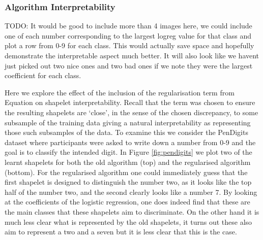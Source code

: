 \subsubsection{Algorithm Interpretability}
TODO: It would be good to include more than 4 images here, we could include one of each number corresponding to the largest logreg value for that class and plot a row from 0-9 for each class. This would actually save space and hopefully demonstrate the interpretable aspect much better. It will also look like we havent just picked out two nice ones and two bad ones if we note they were the largest coefficient for each class.

Here we explore the effect of the inclusion of the regularisation term from Equation \cite{eq:interpretable_reg} on shapelet interpretability. Recall that the term was chosen to ensure the resulting shapelets are `close', in the sense of the chosen discrepancy, to some subsample of the training data giving a natural interpretability as representing those such subsamples of the data. To examine this we consider the PenDigits dataset where participants were asked to write down a number from 0-9 and the goal is to classify the intended digit. In Figure \ref{fig:pendigits} we plot two of the learnt shapelets for both the old algorithm (top) and the regularised algorithm (bottom). For the regularised algorithm one could immediately guess that the first shapelet is designed to distinguish the number two, as it looks like the top half of the number two, and the second clearly looks like a number 7. By looking at the coefficients of the logistic regression, one does indeed find that these are the main classes that these shapelets aim to discriminate. On the other hand it is much less clear what is represented by the old shapelets, it turns out these also aim to represent a two and a seven but it is less clear that this is the case.

